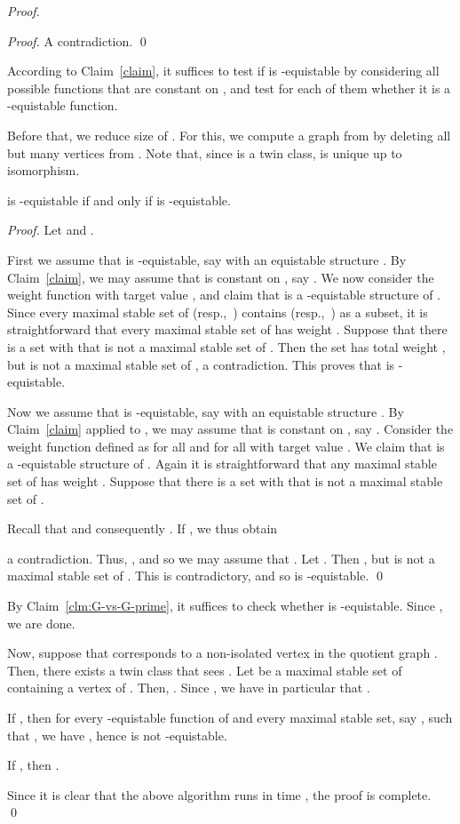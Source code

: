 \documentclass{llncs}
\begin{document}
\begin{proof}
\begin{proof}
A contradiction.
\qed \end{proof}

According to Claim~\ref{claim}, it suffices to test if  is -equistable by
considering all possible functions  that are constant on , and test for each of them whether it is a -equistable function.

Before that, we reduce size of .
For this, we compute a graph  from  by deleting all but  many vertices from .
Note that, since  is a twin class,  is unique up to isomorphism.

\begin{Claim}\label{clm:G-vs-G-prime}
 is -equistable if and only if  is -equistable.
\end{Claim}

\begin{proof}
Let  and .

First we assume that  is -equistable, say with an equistable structure .
By Claim~\ref{claim}, we may assume that  is constant on , say .
We now consider the weight function  with target value , and claim that  is a -equistable structure of .
Since every maximal stable set of  (resp.,~) contains  (resp.,~) as a subset,
it is straightforward that every maximal stable set of  has weight .
Suppose that there is a set  with  that is not a maximal stable set of .
Then the set  has total weight , but is not a maximal stable set of , a contradiction.
This proves that  is -equistable.

Now we assume that  is -equistable, say with an equistable structure .
By Claim~\ref{claim} applied to , we may assume that  is constant on , say .
Consider the weight function  defined as  for all  and  for all  with target
value . We claim that  is a -equistable structure of .
Again it is straightforward that any maximal stable set of  has weight .
Suppose that there is a set  with  that is not a maximal stable set of .

Recall that  and consequently .
If , we thus obtain

a contradiction.
Thus, , and so we may assume that .
Let .
Then , but  is not a maximal stable set of .
This is contradictory, and so  is -equistable.
\qed \end{proof}

By Claim~\ref{clm:G-vs-G-prime}, it suffices to check whether  is -equistable.
Since , we are done.

\bigskip
\begin{sloppypar}
Now, suppose that  corresponds to a non-isolated vertex in the quotient graph .
Then, there exists a twin class  that sees .
Let  be a maximal stable set of  containing a vertex of .
Then, . Since
\hbox{}, we have in particular
that .
\end{sloppypar}

If , then
for every -equistable function  of  and
every maximal stable set, say , such that , we have
, hence  is not -equistable.

If , then .

Since it is clear that the above algorithm runs in time , the proof is complete.
\qed \end{proof}
\end{document}
